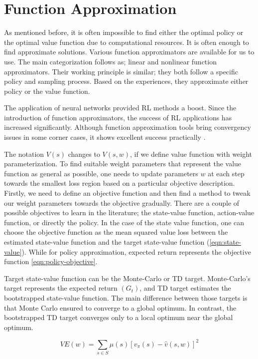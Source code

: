 \section{Function Approximation}
As mentioned before, it is often impossible to find either the optimal policy or the optimal value function due to computational resources. It is often enough to find approximate solutions. Various function approximators are available for us to use. The main categorization follows as; linear and nonlinear function approximators. Their working principle is similar; they both follow a specific policy and sampling process. Based on the experiences, they approximate either policy or the value function. 

The application of neural networks provided RL methods a boost. Since the introduction of function approximators, the success of RL applications has increased significantly. Although function approximation tools bring convergency issues in some corner cases, it shows excellent success practically \cite{Sutton2018}. 

The notation \(V(s)\) changes to \(V(s, w)\), if we define value function with weight parameterization. To find suitable weight parameters that represent the value function as general as possible, one needs to update parameters \(w\) at each step towards the smallest loss region based on a particular objective description. Firstly, we need to define an objective function and then find a method to tweak our weight parameters towards the objective gradually. 
There are a couple of possible objectives to learn in the literature; the state-value function, action-value function, or directly the policy.
In the case of the state value function, one can choose the objective function as the mean squared value loss between the estimated state-value function and the target state-value function (\ref{eqn:state-value}). While for policy approximation, expected return represents the objective function \ref{eqn:policy-objective}. 

Target state-value function can be the Monte-Carlo or TD target. Monte-Carlo's target represents the expected return \((G_t)\), and TD target estimates the bootstrapped state-value function. The main difference between those targets is that Monte Carlo ensured to converge to a global optimum. In contrast, the bootstrapped TD target converges only to a local optimum near the global optimum. 

\begin{equation}
    \label{eqn:state-value}
    VE(w) = \sum\limits_{s\in S} \mu(s)[v_\pi(s) - \hat{v}(s,w)]^2
\end{equation}



